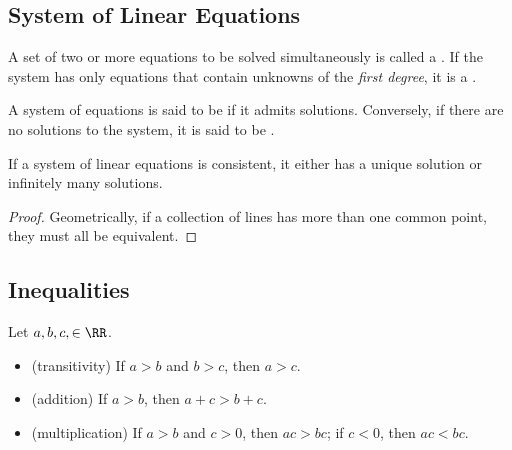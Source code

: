 \subsection{System of Linear Equations}

\begin{definition}
    A set of two or more equations to be solved simultaneously is called a . If the system has only equations that contain unknowns of the \textit{first degree}, it is a .
\end{definition}

\begin{definition}
    A system of equations is said to be  if it admits solutions. Conversely, if there are no solutions to the system, it is said to be .
\end{definition}

\begin{proposition}
    If a system of linear equations is consistent, it either has a unique solution or infinitely many solutions.
\end{proposition}
\begin{proof}
    Geometrically, if a collection of lines has more than one common point, they must all be equivalent.
\end{proof}

\subsection{Inequalities}

\begin{fact}
    Let $a, b, c, \in \RR$.
    \begin{itemize}
        \item (transitivity) If $a > b$ and $b > c$, then $a > c$.
        \item (addition) If $a > b$, then $a + c > b + c$.
        \item (multiplication) If $a > b$ and $c > 0$, then $ac > bc$; if $c < 0$, then $ac < bc$.
    \end{itemize}
\end{fact}

